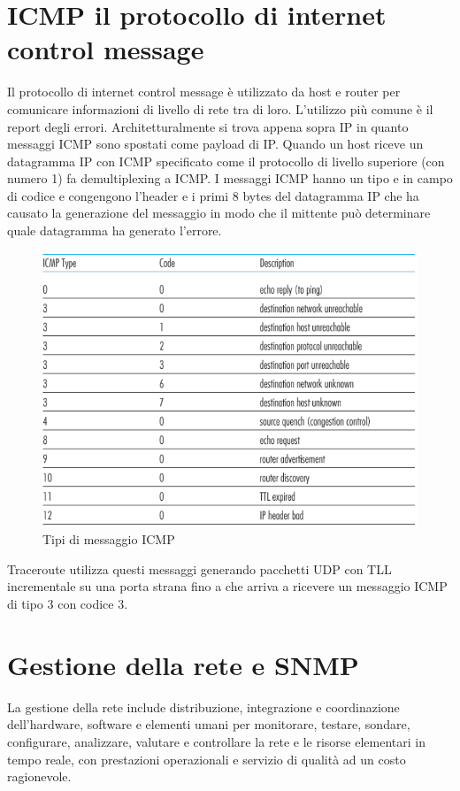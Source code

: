 \section{ICMP il protocollo di internet control message}
Il protocollo di internet control message \`e utilizzato da host e router per comunicare informazioni di livello di rete tra di loro. L'utilizzo pi\`u comune \`e il report degli errori.  Architetturalmente si trova appena
sopra IP in quanto messaggi ICMP sono spostati come payload di IP. Quando un host riceve un datagramma IP con ICMP specificato come il protocollo di livello superiore (con numero 1) fa demultiplexing a 
ICMP. I messaggi ICMP hanno un tipo e in campo di codice e congengono l'header e i primi 8 bytes del datagramma IP che ha causato la generazione del messaggio in modo che il mittente pu\`o determinare
quale datagramma ha generato l'errore.  
\begin{figure}[h]
\includegraphics[width=\textwidth]{ICMPValues.png}
\caption{Tipi di messaggio ICMP}
\end{figure}
Traceroute utilizza questi messaggi generando pacchetti UDP con TLL incrementale su una porta strana fino a che arriva a ricevere un messaggio ICMP di tipo 3 con codice 3.
\section{Gestione della rete e SNMP}
La gestione della rete include distribuzione, integrazione e coordinazione dell'hardware, software e elementi umani per monitorare, testare, sondare, configurare, analizzare, valutare e controllare la rete e le
risorse elementari in tempo reale, con prestazioni operazionali e servizio di qualit\`a ad un costo ragionevole. 

